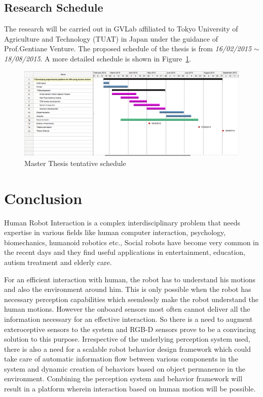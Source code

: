 \subsection{Research Schedule}
	The research will be carried out in GVLab affiliated to Tokyo University of Agriculture and Technology (TUAT) in Japan under the guidance of Prof.Gentiane Venture. The proposed schedule of the thesis is from \emph{16/02/2015} $\sim$ \emph{18/08/2015}. A more detailed schedule is shown in Figure~\ref{fig:schedule}.
	
\clearpage
\begin{landscape}
\begin{figure}
\centering
\includegraphics[width=\hsize]{assets/schedule.png}
\caption{Master Thesis tentative schedule}
\label{fig:schedule}
\end{figure}
\end{landscape}

\section{Conclusion} %
	Human Robot Interaction is a complex interdisciplinary problem that needs expertise in various fields like human computer interaction, psychology, biomechanics, humanoid robotics etc., Social robots have become very common in the recent days and they find useful applications in entertainment, education, autism treatment and elderly care. 
	
	For an efficient interaction with human, the robot has to understand his motions and also the environment around him. This is only possible when the robot has necessary perception capabilities which seemlessly make the robot understand the human motions. However the onboard sensors most often cannot deliver all the information necessary for an effective interaction. So there is a need to augment exteroceptive sensors to the system and RGB-D sensors prove to be a convincing solution to this purpose. Irrespective of the underlying perception system used, there is also a need for a scalable robot behavior design framework which could take care of automatic information flow between various components in the system and dynamic creation of behaviors based on object permanence in the environment. Combining the perception system and behavior framework will result in a platform wherein interaction based on human motion will be possible. 
	
